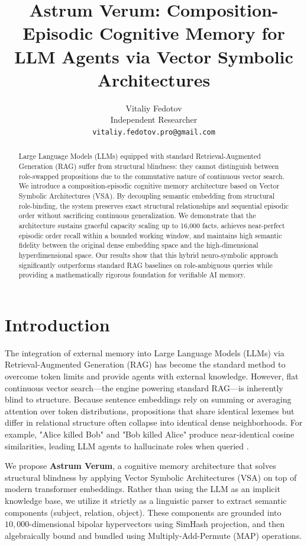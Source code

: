 \documentclass[11pt,letterpaper]{article}
\title{\LARGE \bf Astrum Verum: Composition-Episodic Cognitive Memory for LLM Agents via Vector Symbolic Architectures}
\author{
Vitaliy Fedotov \\
Independent Researcher \\
\texttt{vitaliy.fedotov.pro@gmail.com}
}
\date{}
\begin{document}
\maketitle

\begin{abstract}
Large Language Models (LLMs) equipped with standard Retrieval-Augmented Generation (RAG) suffer from structural blindness: they cannot distinguish between role-swapped propositions due to the commutative nature of continuous vector search. We introduce a composition-episodic cognitive memory architecture based on Vector Symbolic Architectures (VSA). By decoupling semantic embedding from structural role-binding, the system preserves exact structural relationships and sequential episodic order without sacrificing continuous generalization. We demonstrate that the architecture sustains graceful capacity scaling up to 16,000 facts, achieves near-perfect episodic order recall within a bounded working window, and maintains high semantic fidelity between the original dense embedding space and the high-dimensional hyperdimensional space. Our results show that this hybrid neuro-symbolic approach significantly outperforms standard RAG baselines on role-ambiguous queries while providing a mathematically rigorous foundation for verifiable AI memory.
\end{abstract}

\section{Introduction}
\label{sec:intro}

The integration of external memory into Large Language Models (LLMs) via Retrieval-Augmented Generation (RAG) \cite{lewis2020rag} has become the standard method to overcome token limits and provide agents with external knowledge. However, flat continuous vector search---the engine powering standard RAG---is inherently blind to structure. Because sentence embeddings rely on summing or averaging attention over token distributions, propositions that share identical lexemes but differ in relational structure often collapse into identical dense neighborhoods. For example, "Alice killed Bob" and "Bob killed Alice" produce near-identical cosine similarities, leading LLM agents to hallucinate roles when queried \cite{kanerva2009hyperdimensional}.

We propose \textbf{Astrum Verum}, a cognitive memory architecture that solves structural blindness by applying Vector Symbolic Architectures (VSA) \cite{gayler2004vsa, kanerva2009hyperdimensional} on top of modern transformer embeddings. Rather than using the LLM as an implicit knowledge base, we utilize it strictly as a linguistic parser to extract semantic components (subject, relation, object). These components are grounded into $10,000$-dimensional bipolar hypervectors using SimHash projection, and then algebraically bound and bundled using Multiply-Add-Permute (MAP) operations.
\end{document}

